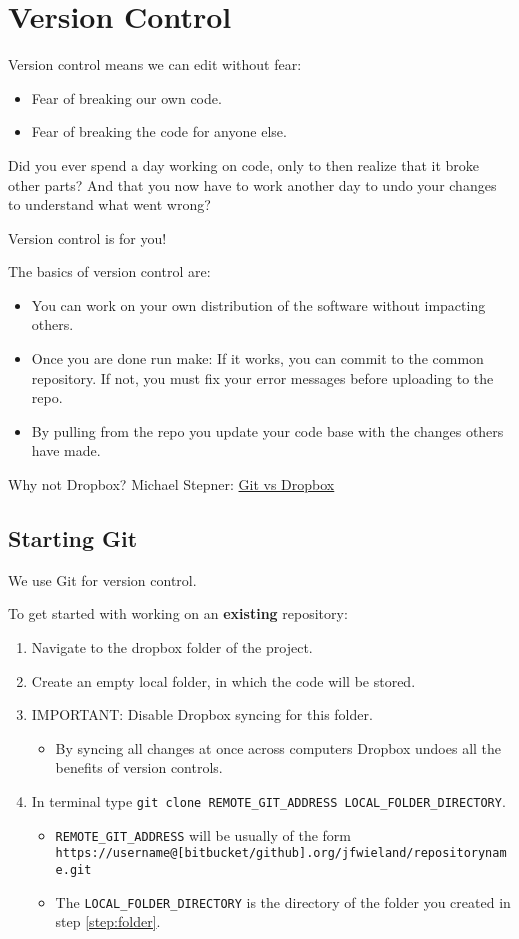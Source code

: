 \section{Version Control}

Version control means we can edit without fear:
\begin{itemize}
	\item Fear of breaking our own code.
	\item Fear of breaking the code for anyone else.
\end{itemize}
Did you ever spend a day working on code, only to then realize that it broke other parts? And that you now have to work another day to undo your changes to understand what went wrong?

Version control is for you!

The basics of version control are:
\begin{itemize}
	\item You can work on your own distribution of the software without impacting others.
	\item Once you are done run make: If it works, you can commit to the common repository. If not, you must fix your error messages before uploading to the repo.
	\item By pulling from the repo you update your code base with the changes others have made.
\end{itemize}

Why not Dropbox? Michael Stepner: \href{https://michaelstepner.com/blog/git-vs-dropbox/}{Git vs Dropbox}

\subsection{Starting Git}

We use Git for version control.

To get started with working on an \textbf{existing} repository: 
\begin{enumerate}
	\item Navigate to the dropbox folder of the project.
	\item\label{step:folder} Create an empty local folder, in which the code will be stored.
	\item IMPORTANT: Disable Dropbox syncing for this folder.
	\begin{itemize}
		\item By syncing all changes at once across computers Dropbox undoes all the benefits of version controls.
	\end{itemize}
	\item In terminal type \texttt{git clone REMOTE\_GIT\_ADDRESS LOCAL\_FOLDER\_DIRECTORY}.
	\begin{itemize}
		\item \texttt{REMOTE\_GIT\_ADDRESS} will be usually of the form \texttt{https://username@[bitbucket/github].org/jfwieland/repositoryname.git}
		\item The \texttt{LOCAL\_FOLDER\_DIRECTORY} is the directory of the folder you created in step \ref{step:folder}.
	\end{itemize}
\end{enumerate}


